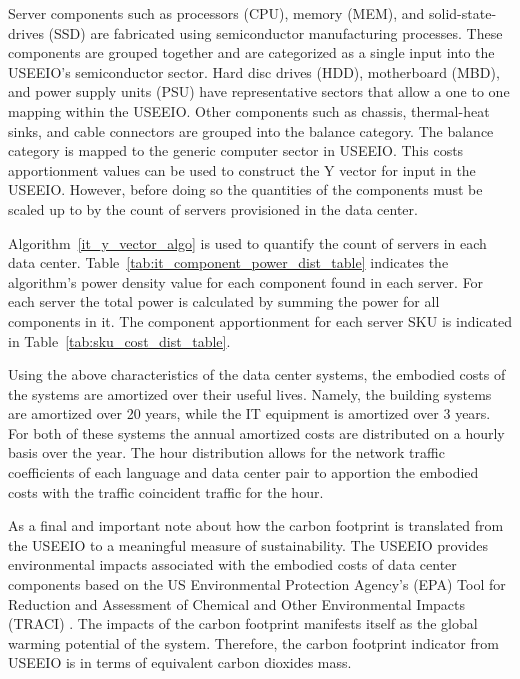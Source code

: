         Server components such as processors (CPU), memory (MEM), and solid-state-drives (SSD) are fabricated using semiconductor manufacturing processes. These components are grouped together and are categorized as a single input into the USEEIO’s semiconductor sector. Hard disc drives (HDD), motherboard (MBD), and power supply units (PSU) have representative sectors that allow a one to one mapping within the USEEIO. Other components such as chassis, thermal-heat sinks, and cable connectors are grouped into the balance category. The balance category is mapped to the generic computer sector in USEEIO. This costs apportionment values can be used to construct the Y vector for input in the USEEIO. However, before doing so the quantities of the components must be scaled up to by the count of servers provisioned in the data center.
        
         Algorithm~\ref{it_y_vector_algo} is used to quantify the count of servers in each data center. Table~\ref{tab:it_component_power_dist_table} indicates the algorithm's power density value for each component found in each server. For each server the total power is calculated by summing the power for all components in it. The component apportionment for each server SKU is indicated in Table~\ref{tab:sku_cost_dist_table}.
         
        
        
        
        

        Using the above characteristics of the data center systems, the embodied costs of the systems are amortized over their useful lives. Namely, the building systems are amortized over 20 years, while the IT equipment is amortized over 3 years. For both of these systems the annual amortized costs are distributed on a hourly basis over the year. The hour distribution allows for the network traffic coefficients of each language and data center pair to apportion the embodied costs with the traffic coincident traffic for the hour.
        
        As a final and important note about how the carbon footprint is translated from the USEEIO to a meaningful measure of sustainability. The USEEIO provides environmental impacts associated with the embodied costs of data center components based on the US Environmental Protection Agency's (EPA) Tool for Reduction and Assessment of Chemical and Other Environmental Impacts (TRACI) \cite{EPA12}. The impacts of the carbon footprint manifests itself as the global warming potential of the system. Therefore, the carbon footprint indicator from USEEIO is in terms of equivalent carbon dioxides mass.
       
